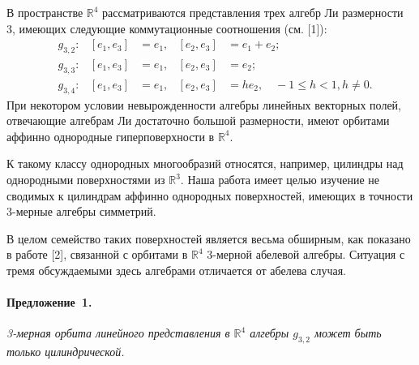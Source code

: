 \documentclass{vzmsthesis}
\begin{document}

\vzmscaption


В пространстве $\mathbb{R}^4 $ рассматриваются представления трех алгебр Ли размерности 3, имеющих следующие
коммутационные соотношения (см. [1]):
\begin{align*}
	&g_{3,2} : & [e_1,e_3] &= e_1, & [e_2,e_3] &= e_1 + e_2;\\
	&g_{3,3} : & [e_1,e_3] &= e_1, & [e_2,e_3] &= e_2;\\
    &g_{3,4} : & [e_1,e_3] &= e_1, & [e_2,e_3] &=  h e_2, \quad -1 \leqslant h < 1, h \neq 0.
\end{align*}
При некотором условии невырожденности алгебры линейных векторных полей, отвечающие алгебрам Ли достаточно большой размерности, имеют орбитами аффинно однородные гиперповерхности в $\mathbb{R}^4$.

К такому классу однородных многообразий относятся, например, цилиндры над однородными поверхностями из $\mathbb{R}^3$.
Наша работа имеет целью изучение не сводимых к цилиндрам аффинно однородных поверхностей, имеющих в точности 3-мерные алгебры симметрий.

В целом семейство таких поверхностей является весьма обширным, как показано в работе [2], связанной с орбитами в $\mathbb{R}^4$ 3-мерной абелевой алгебры. Ситуация с тремя обсуждаемыми здесь алгебрами отличается от абелева случая.

\paragraph{Предложение~1.}
{\it
3-мерная орбита линейного представления в $\mathbb{R}^4$ алгебры $g_{3,2}$ может быть только цилиндрической.
}
\end{document}
